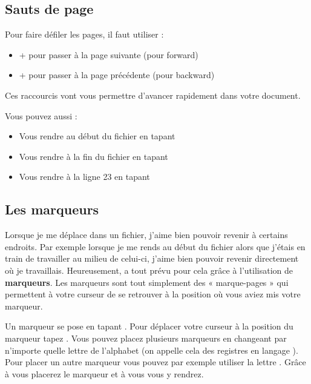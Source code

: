 \subsection{Sauts de page}

Pour faire défiler les pages, il faut utiliser :

\bigskip

\begin{itemize}
    \item \tctrl + \tf pour passer à la page suivante (\tf pour forward)
    \item \tctrl + \tb pour passer à la page précédente (\tb pour backward)
\end{itemize}

\bigskip

Ces raccourcis vont vous permettre d'avancer rapidement dans votre document. 

Vous pouvez aussi :

\begin{itemize}
    \item Vous rendre au début du fichier en tapant \tg\tg
    \item Vous rendre à la fin du fichier en tapant \tG
    \item Vous rendre à la ligne 23 en tapant \tcolon{}
\end{itemize}

\subsection{Les marqueurs}

Lorsque je me déplace dans un fichier, j'aime bien pouvoir revenir à certains endroits. Par exemple lorsque je me rends au début du fichier alors que j'étais en train de travailler au milieu de celui-ci, j'aime bien pouvoir revenir directement où je travaillais. Heureusement, \vim a tout prévu pour cela grâce à l'utilisation de \textbf{marqueurs}. Les marqueurs sont tout simplement des « marque-pages » qui permettent à votre curseur de se retrouver à la position où vous aviez mis votre marqueur.

Un marqueur se pose en tapant \tm\ta. Pour déplacer votre curseur à la position du marqueur tapez \tapos\ta. Vous pouvez placez plusieurs marqueurs en changeant \ta par n'importe quelle lettre de l'alphabet (on appelle cela des registres en langage \vim). Pour placer un autre marqueur vous pouvez par exemple utiliser la lettre \td. Grâce à \tm\td\xspace vous placerez le marqueur et à \tapos\td\xspace vous vous y rendrez.

